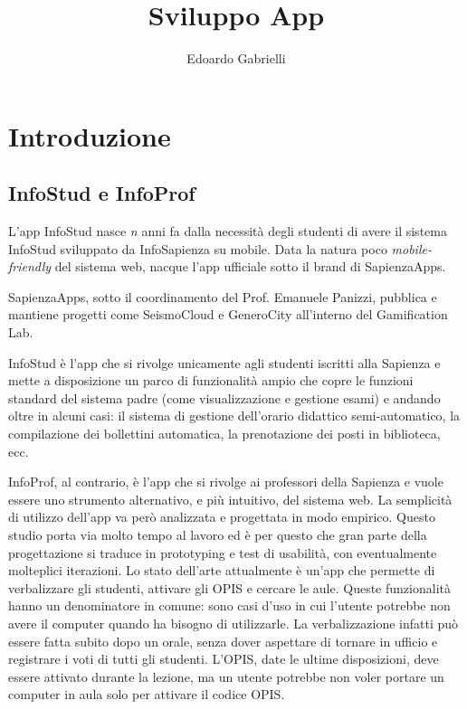 \documentclass[Lau, oneside]{sapthesis}%
\title{Sviluppo App}
\author{Edoardo Gabrielli}
\begin{document}
\frontmatter
\maketitle

\tableofcontents

\mainmatter
\chapter{Introduzione}
\label{ch:1}

\section{InfoStud e InfoProf}
\label{sec:pres}
L'app InfoStud nasce \textit{n} anni fa dalla necessità degli studenti di avere il sistema InfoStud sviluppato da InfoSapienza su mobile.
Data la natura poco \textit{mobile-friendly} del sistema web, nacque l'app ufficiale sotto il brand di SapienzaApps.

SapienzaApps, sotto il coordinamento del Prof. Emanuele Panizzi, pubblica e mantiene progetti come SeismoCloud e GeneroCity all'interno
del Gamification Lab.

InfoStud è l'app che si rivolge unicamente agli studenti iscritti alla Sapienza e mette a disposizione un parco di funzionalità ampio
che copre le funzioni standard del sistema padre (come visualizzazione e gestione esami) e andando oltre in alcuni casi: il sistema
di gestione dell'orario didattico semi-automatico, la compilazione dei bollettini automatica, la prenotazione dei posti in biblioteca, ecc.

InfoProf, al contrario, è l'app che si rivolge ai professori della Sapienza e vuole essere uno strumento alternativo, e più intuitivo, 
del sistema web. La semplicità di utilizzo dell'app va però analizzata e progettata in modo empirico. Questo studio porta via molto tempo 
al lavoro ed è per questo che gran parte della progettazione si traduce in prototyping e test di usabilità, con eventualmente molteplici
iterazioni. Lo stato dell'arte attualmente è un'app che permette di verbalizzare gli studenti, attivare gli OPIS e cercare le aule.
Queste funzionalità hanno un denominatore in comune: sono casi d'uso in cui l'utente potrebbe non avere il computer quando ha bisogno
di utilizzarle. La verbalizzazione infatti può essere fatta subito dopo un orale, senza dover aspettare di tornare in ufficio e 
registrare i voti di tutti gli studenti. L'OPIS, date le ultime disposizioni, deve essere attivato durante la lezione, ma un utente
potrebbe non voler portare un computer in aula solo per attivare il codice OPIS.
\end{document}
